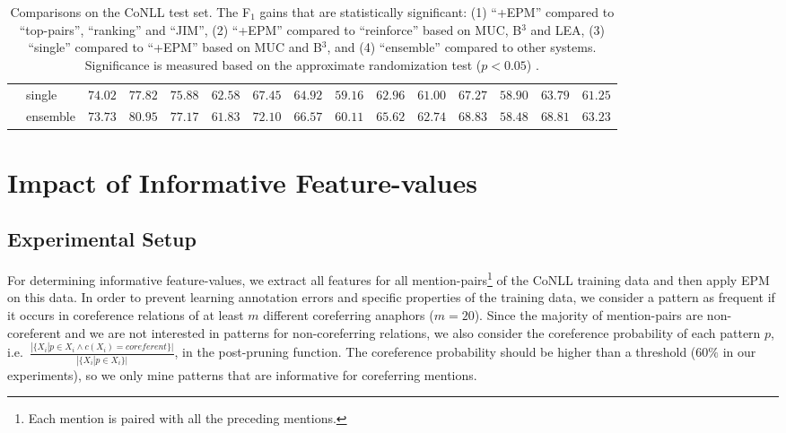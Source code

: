 \begin{table*}[!htb]
\begin{center}
{\begin{tabular}{@{}l|l|@{\hskip3pt}rrr@{\hskip3pt}|@{\hskip3pt}rrr@{\hskip3pt}|@{\hskip3pt}rrr@{\hskip3pt}|r@{\hskip3pt}||@{\hskip3pt}rrr@{\hskip3pt}}
     & single & $74.02$ & $77.82$ & $75.88$ & $62.58$ & $67.45$ & $64.92$ & $59.16$ & $62.96$ & $61.00$ & $67.27$ & $58.90$ & $63.79$ & $61.25$ \\
     & ensemble & $73.73$ & $80.95$ & $77.17$ & $61.83$ & $72.10$ & $66.57$ & $60.11$ & $65.62$ & $62.74$ & $68.83$ & $58.48$ & $68.81$ & $63.23$\\
     \hline
    \end{tabular}
    }
    \end{center}
    \caption{\footnotesize Comparisons on the CoNLL test set. 
    The F$_1$ gains that are statistically significant: (1) ``+EPM'' compared to ``top-pairs'', ``ranking'' and ``JIM'', (2) ``+EPM'' compared to ``reinforce'' based on MUC, B$^3$ and LEA, (3) ``single'' compared to ``+EPM'' based on MUC and B$^3$, and (4) 
``ensemble'' compared to other systems. Significance is measured based on the approximate randomization test ($p<0.05$) \cite{noreen89}.
    }
    \label{tab:in-domain-evaluations}
\end{table*}

\section{Impact of Informative Feature-values}
\subsection{Experimental Setup}
\label{ch:improvements_baseline}
For determining informative feature-values, 
we extract all features for all mention-pairs\footnote{Each mention is paired with all the preceding mentions.} of the CoNLL training data 
and then apply EPM on this 
data.
In order to prevent learning annotation errors and specific properties of the training data, 
we consider a pattern as frequent if it occurs in coreference relations of at least 
$m$ different coreferring anaphors ($m=20$).
Since the majority of mention-pairs are non-coreferent and we are not interested in patterns for non-coreferring relations, 
we also consider the coreference probability of each pattern $p$, i.e.\ $\frac{|\{X_i|p \in X_i \land c(X_i)=coreferent\}|}{|\{X_i|p \in X_i\}|}$, 
in the post-pruning function. 
The coreference probability should be higher than a threshold ($60\%$ in our experiments),
so we only mine patterns that are informative for coreferring mentions.%


